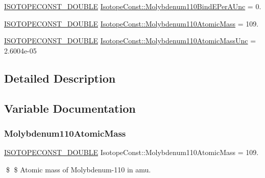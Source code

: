 \begin{DoxyCompactItemize}
\item 
\mbox{\hyperlink{group___isotope_const-_macros_ga8f45a7272ce02c0b4c65c44636ed719a}{I\+S\+O\+T\+O\+P\+E\+C\+O\+N\+S\+T\+\_\+\+D\+O\+U\+B\+LE}} \mbox{\hyperlink{group___isotope_const-_molybdenum-_mo110_gab4fc3b17b8547abf5904c3054f081944}{Isotope\+Const\+::\+Molybdenum110\+Bind\+E\+Per\+A\+Unc}} = 0.
\item 
\mbox{\hyperlink{group___isotope_const-_macros_ga8f45a7272ce02c0b4c65c44636ed719a}{I\+S\+O\+T\+O\+P\+E\+C\+O\+N\+S\+T\+\_\+\+D\+O\+U\+B\+LE}} \mbox{\hyperlink{group___isotope_const-_molybdenum-_mo110_gaa944cdf5b61cfd2a0b2be5456ac0944e}{Isotope\+Const\+::\+Molybdenum110\+Atomic\+Mass}} = 109.
\item 
\mbox{\hyperlink{group___isotope_const-_macros_ga8f45a7272ce02c0b4c65c44636ed719a}{I\+S\+O\+T\+O\+P\+E\+C\+O\+N\+S\+T\+\_\+\+D\+O\+U\+B\+LE}} \mbox{\hyperlink{group___isotope_const-_molybdenum-_mo110_ga8b86b7d3325345df2deb4b6e914b03ec}{Isotope\+Const\+::\+Molybdenum110\+Atomic\+Mass\+Unc}} = 2.\+6004e-\/05
\end{DoxyCompactItemize}


\subsection{Detailed Description}


\subsection{Variable Documentation}
\mbox{\label{group___isotope_const-_molybdenum-_mo110_gaa944cdf5b61cfd2a0b2be5456ac0944e}} 
\subsubsection{\texorpdfstring{Molybdenum110\+Atomic\+Mass}{Molybdenum110AtomicMass}}
{\footnotesize\ttfamily \mbox{\hyperlink{group___isotope_const-_macros_ga8f45a7272ce02c0b4c65c44636ed719a}{I\+S\+O\+T\+O\+P\+E\+C\+O\+N\+S\+T\+\_\+\+D\+O\+U\+B\+LE}} Isotope\+Const\+::\+Molybdenum110\+Atomic\+Mass = 109.}

\$ \$ Atomic mass of Molybdenum-\/110 in amu. \mbox{\label{group___isotope_const-_molybdenum-_mo110_ga8b86b7d3325345df2deb4b6e914b03ec}} 
